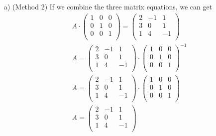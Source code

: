\documentclass{article}
\begin{document}
a) (Method 2) 
If we combine the three matrix equations, we can get
\begin{gather*}
  A \cdot \begin{pmatrix}
            1 & 0 & 0 \\
            0 & 1 & 0 \\
            0 & 0 & 1 \\
          \end{pmatrix} =
  \begin{pmatrix}
    2 & -1 & 1 \\
    3 & 0 & 1 \\
    1 & 4 & -1 \\
  \end{pmatrix} \\
  A = \begin{pmatrix}
        2 & -1 & 1 \\
        3 & 0 & 1 \\
        1 & 4 & -1 \\ 
      \end{pmatrix} \cdot
      \begin{pmatrix}
        1 & 0 & 0 \\
        0 & 1 & 0 \\
        0 & 0 & 1 \\
      \end{pmatrix}^{-1} \\
  A = \begin{pmatrix}
        2 & -1 & 1 \\
        3 & 0 & 1 \\
        1 & 4 & -1 \\ 
      \end{pmatrix} \cdot
      \begin{pmatrix}
        1 & 0 & 0 \\
        0 & 1 & 0 \\
        0 & 0 & 1 \\
      \end{pmatrix} \\
  A = \begin{pmatrix}
        2 & -1 & 1 \\
        3 & 0 & 1 \\
        1 & 4 & -1 \\ 
      \end{pmatrix} \\
\end{gather*}
\end{document}
